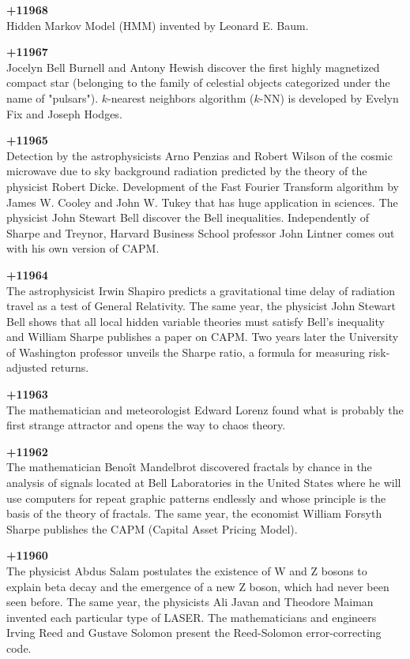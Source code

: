 \textbf{+11968}\\
Hidden Markov Model (HMM) invented by Leonard E. Baum.

\textbf{+11967}\\
Jocelyn Bell Burnell and Antony Hewish discover the first highly magnetized compact star (belonging to the family of celestial objects categorized under the name of "pulsars"). $k$-nearest neighbors algorithm ($k$-NN) is developed by Evelyn Fix and Joseph Hodges.

\textbf{+11965}\\
Detection by the astrophysicists Arno Penzias and Robert Wilson of the cosmic microwave due to sky background radiation predicted by the theory of the physicist Robert Dicke. Development of the Fast Fourier Transform algorithm by James W. Cooley and John W. Tukey that has huge application in sciences. The physicist John Stewart Bell discover the Bell inequalities. Independently of Sharpe and Treynor, Harvard Business School professor John Lintner comes out with his own version of CAPM.

\textbf{+11964}\\
The astrophysicist Irwin Shapiro predicts a gravitational time delay of radiation travel as a test of General Relativity. The same year, the physicist John Stewart Bell shows that all local hidden variable theories must satisfy Bell's inequality and William Sharpe publishes a paper on CAPM. Two years later the University of Washington professor unveils the Sharpe ratio, a formula for measuring risk-adjusted returns.

\textbf{+11963}\\
The mathematician and meteorologist Edward Lorenz found what is probably the first strange attractor and opens the way to chaos theory.

\textbf{+11962}\\
The mathematician Benoît Mandelbrot discovered fractals by chance in the analysis of signals located at Bell Laboratories in the United States where he will use computers for repeat graphic patterns endlessly and whose principle is the basis of the theory of fractals. The same year, the economist William Forsyth Sharpe publishes the CAPM (Capital Asset Pricing Model). 

\textbf{+11960}\\
The physicist Abdus Salam postulates the existence of W and Z bosons to explain beta decay and the emergence of a new Z boson, which had never been seen before. The same year, the physicists Ali Javan and Theodore Maiman invented each particular type of LASER. The mathematicians and engineers Irving Reed and Gustave Solomon present the Reed-Solomon error-correcting code.

